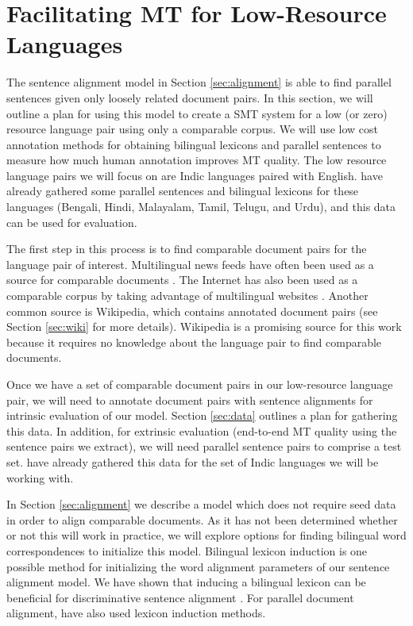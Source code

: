 \documentclass[11pt,letterpaper]{article}
\begin{document}
\section{Facilitating MT for Low-Resource Languages}
The sentence alignment model in Section \ref{sec:alignment} is able
to find parallel sentences given only loosely related document pairs. In this
section, we will outline a plan for using this model to create a SMT system for
a low (or zero) resource language pair using only a comparable corpus. We will
use low cost annotation methods \cite{Zaidan11,Post12} for obtaining bilingual
lexicons and parallel sentences to measure how much human annotation improves
MT quality. The low resource language pairs we will focus on are Indic languages
paired with English.  have already gathered some parallel
sentences and bilingual lexicons for these languages (Bengali, Hindi, Malayalam,
Tamil, Telugu, and Urdu), and this data can be used for evaluation.

The first step in this process is to find comparable document pairs for the
language pair of interest. Multilingual news feeds have often been used as a
source for comparable documents \cite{Munteanu05}. The Internet has also been
used as a comparable corpus by taking advantage of multilingual websites
\cite{Resnik03,Uszkoreit10}. Another common source is
Wikipedia, which contains annotated document pairs (see Section \ref{sec:wiki}
for more details). Wikipedia is a promising source for this work because it
requires no knowledge about the language pair to find comparable documents.

Once we have a set of comparable document pairs in our low-resource language pair, we
will need to annotate document pairs with sentence alignments for intrinsic
evaluation of our model. Section \ref{sec:data} outlines a plan for gathering
this data. In addition, for extrinsic evaluation (end-to-end MT quality using
the sentence pairs we extract), we will need parallel sentence pairs to comprise
a test set.  have already gathered this data for the set of
Indic languages we will be working with.

In Section \ref{sec:alignment} we describe a model which does not require seed
data in order to align comparable documents. As it has not been determined
whether or not this will work in practice, we will explore options for finding
bilingual word correspondences to initialize this model. Bilingual lexicon
induction \cite{Rapp95,Fung98} is one possible method for initializing the word
alignment parameters of our sentence alignment model. We have shown that
inducing a bilingual lexicon can be beneficial for discriminative sentence
alignment \cite{Smith10}. For parallel document alignment,
 have also used lexicon induction methods.
\end{document}
